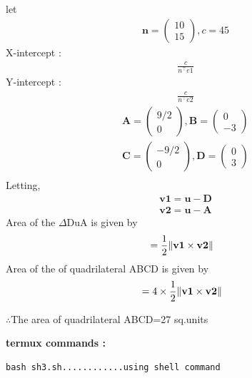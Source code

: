 \documentclass[10pt, a4paper]{article}
\newcommand{\myvec}[1]{\ensuremath{\begin{pmatrix}#1\end{pmatrix}}}
\let\vec\mathbf
\begin{document}
let
		\begin{align}
	    \vec{n} = \myvec{10 \\ 15},c=45
	    	\end{align}
	    X-intercept :
	    \begin{align}
	    \frac{c}{n^{\top}e1}
	    \end{align}
	    Y-intercept : 
	    \begin{align}
	    \frac{c}{n^{\top}e2}
	    \end{align}
	    \begin{align}
	    \vec{A} = \myvec{9/2 \\ 0},  
	    \vec{B} = \myvec{ 0 \\ -3}\\
	    \vec{C} = \myvec{-9/2 \\ 0},    
	    \vec{D} = \myvec{ 0 \\ 3}\\
		\end{align}
Letting,
\begin{align}
\vec{v1}=\vec{u}-\vec{D}\\
\vec{v2}=\vec{u}-\vec{A}
\end{align}		
	Area of the $\Delta$DuA is given by 
	\begin{align}
&=\frac{1}{2}\norm{\vec{v1}\times\vec{v2}}
\end{align}
	Area of the of quadrilateral ABCD is given by 
	\begin{align}
&=4\times\frac{1}{2}\norm{\vec{v1}\times\vec{v2}}
\end{align}
\begin{center}
    $\therefore$The area of quadrilateral ABCD=27 sq.units\\
\end{center}
\textbf{termux commands :}
\begin{lstlisting}
bash sh3.sh............using shell command
\end{lstlisting}
\end{document}
